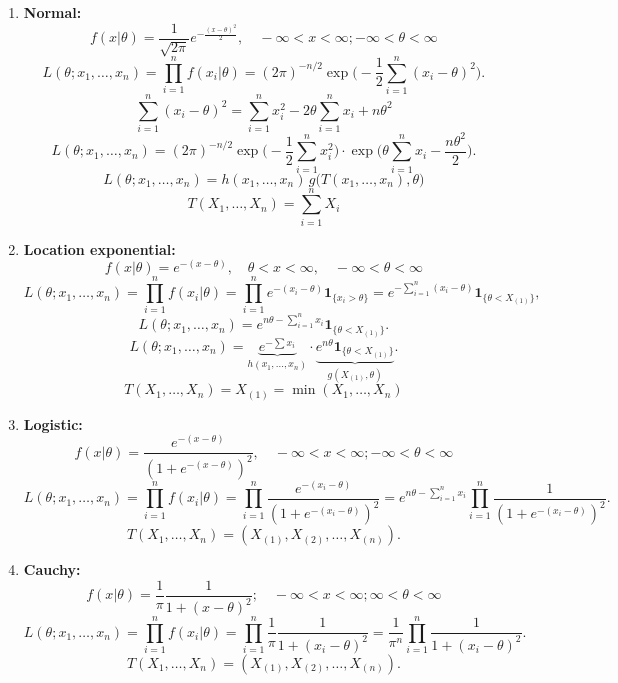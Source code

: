\documentclass{article}
\begin{document}
\begin{enumerate}
	\item \textbf{Normal:}
	      $$f(x|\theta) =\frac{1}{\sqrt{2\pi}}e^{-\frac{(x-\theta)^2}{2}}, \quad - \infty<x<\infty; - \infty<\theta<\infty$$
	      \[
		      L(\theta; x_1, \dots, x_n) = \prod_{i=1}^{n} f(x_i|\theta)
		      = (2\pi)^{-n/2} \exp\Bigg(-\frac{1}{2} \sum_{i=1}^{n} (x_i - \theta)^2 \Bigg).
	      \]
	      \[
		      \sum_{i=1}^{n} (x_i - \theta)^2 = \sum_{i=1}^{n} x_i^2 - 2 \theta \sum_{i=1}^{n} x_i + n \theta^2
	      \]
	      \[
		      L(\theta; x_1, \dots, x_n) = (2\pi)^{-n/2} \exp\Bigg(-\frac{1}{2} \sum_{i=1}^{n} x_i^2 \Bigg) \cdot \exp\Bigg(\theta \sum_{i=1}^{n} x_i - \frac{n \theta^2}{2} \Bigg).
	      \]
	      \[
		      L(\theta; x_1, \dots, x_n) = h(x_1, \dots, x_n) \, g\Big(T(x_1, \dots, x_n), \theta\Big)
	      \]
	      \[
		      \boxed{T(X_1, \dots, X_n) = \sum_{i=1}^{n} X_i}
	      \]


	\item \textbf{Location exponential:}
	      $$f(x|\theta) =e^{-(x-\theta)}, \quad \theta < x < \infty, \quad - \infty<\theta<\infty$$
	      \[
		      L(\theta; x_1, \dots, x_n) = \prod_{i=1}^{n} f(x_i|\theta)
		      = \prod_{i=1}^{n} e^{-(x_i - \theta)} \mathbf{1}_{\{x_i > \theta\}}
		      = e^{-\sum_{i=1}^{n} (x_i - \theta)} \mathbf{1}_{\{\theta < X_{(1)}\}},
	      \]
	      \[
		      L(\theta; x_1, \dots, x_n) = e^{n \theta - \sum_{i=1}^{n} x_i} \mathbf{1}_{\{\theta < X_{(1)}\}}.
	      \]
	      \[
		      L(\theta; x_1, \dots, x_n) = \underbrace{e^{-\sum x_i}}_{h(x_1, \dots, x_n)} \cdot \underbrace{e^{n\theta} \mathbf{1}_{\{\theta < X_{(1)}\}}}_{g(X_{(1)}, \theta)}.
	      \]
	      \[
		      \boxed{T(X_1, \dots, X_n) = X_{(1)} = \min(X_1, \dots, X_n)}
	      \]

	\item \textbf{Logistic:}
	      $$f(x|\theta) =\frac{e^{-(x-\theta)}}{(1+e^{-(x-\theta)})^2}, \quad -\infty < x < \infty; - \infty<\theta<\infty$$
	      \[
		      L(\theta; x_1, \dots, x_n) = \prod_{i=1}^{n} f(x_i|\theta)
		      = \prod_{i=1}^{n} \frac{e^{-(x_i-\theta)}}{\left(1 + e^{-(x_i-\theta)}\right)^2}
		      = e^{n\theta - \sum_{i=1}^{n} x_i} \prod_{i=1}^{n} \frac{1}{\left(1 + e^{-(x_i-\theta)}\right)^2}.
	      \]
	      \[
		      \boxed{T(X_1, \dots, X_n) = (X_{(1)}, X_{(2)}, \dots, X_{(n)}) \text{}}.
	      \]
	\item \textbf{Cauchy:}
	      $$f(x|\theta) = \frac{1}{\pi} \frac{1}{1 + (x-\theta)^2}; \quad - \infty<x<\infty; \infty<\theta<\infty$$
	      \[
		      L(\theta; x_1, \dots, x_n) = \prod_{i=1}^{n} f(x_i|\theta)
		      = \prod_{i=1}^{n} \frac{1}{\pi} \frac{1}{1 + (x_i-\theta)^2}
		      = \frac{1}{\pi^n} \prod_{i=1}^{n} \frac{1}{1 + (x_i-\theta)^2}.
	      \]
	      \[
		      \boxed{T(X_1, \dots, X_n) = (X_{(1)}, X_{(2)}, \dots, X_{(n)}) \text{}}.
	      \]


\end{enumerate}
\end{document}
